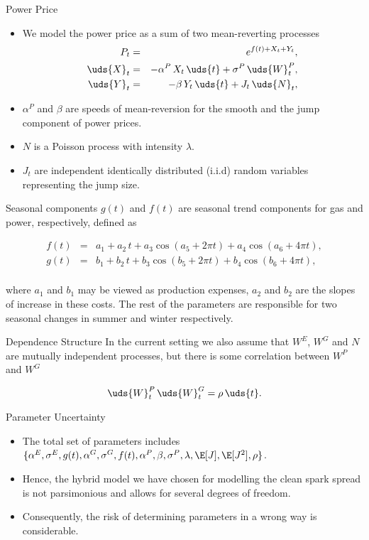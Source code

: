 {Power Price}
\begin{itemize}
\item We model the power price as a sum of two mean-reverting processes
\begin{eqnarray}
P_t & = & e^{f(t) + X_t + Y_t},  \nonumber \\
\uds{X}_t & = & -\alpha^P\,X_t\,\uds{t} + \sigma^P\,\uds{W}^P_t, \nonumber \\
\uds{Y}_t & = & -\beta\,Y_t\,\uds{t} + J_t\,\uds{N}_t,
\label{power}
\end{eqnarray}
\item $\alpha^P$ and $\beta$ are speeds of mean-reversion for the smooth and the jump component of power prices.
\item $N$ is a Poisson process with intensity $\lambda$.
\item $J_t$ are independent identically distributed (i.i.d) random variables representing the jump size.
\end{itemize}



{Seasonal components}
$g(t)$ and $f(t)$ are seasonal trend components for gas and power, respectively, defined as

\begin{eqnarray}
f(t) &=& a_1 + a_2\,t + a_3\cos(a_5 + 2\pi t) + a_4\cos(a_6 + 4\pi t), \nonumber \\
g(t) &=& b_1 + b_2\,t + b_3\cos(b_5 + 2\pi t) + b_4\cos(b_6 + 4\pi t), \nonumber \\
\label{grseasonality}
\end{eqnarray}

where $a_1$ and $b_1$ may be viewed as production expenses, $a_2$ and $b_2$ are the slopes of increase in these costs. The rest of the parameters are responsible for two seasonal changes in summer and winter respectively.



{Dependence Structure}
In the current setting we also assume that $W^E$, $W^G$ and $N$ are mutually independent processes, but there is some correlation between  $W^P$ and $W^G$

\begin{equation}
\uds{W}^P_t\,\uds{W}^G_t = \rho\,\uds{t}.
\label{corr}
\end{equation}



{Parameter Uncertainty}
\begin{itemize}
\item The total set of parameters includes $\{\alpha^E, \sigma^E, g(t), \alpha^G, \sigma^G, f(t), \alpha^P, \beta, \sigma^P, \lambda, \E[J], \E[J^2], \rho\}$.
\item Hence, the hybrid model we have chosen for modelling the clean spark spread is not parsimonious and allows for several degrees of freedom.
\item Consequently, the risk of determining parameters in a wrong way is considerable.
\end{itemize}

